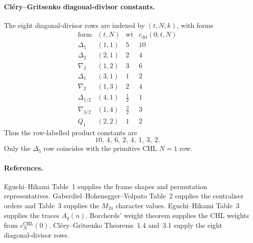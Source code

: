 \paragraph{Cl\'ery--Gritsenko diagonal-divisor constants.}
The eight diagonal-divisor rows are indexed by \((t,N;k)\), with
forms
\[
\begin{array}{c|c|c|c}
\text{form} & (t,N) & \operatorname{wt} & c_{\mathrm{dd}}(0;t,N)\\
\hline
\Delta_5 & (1,1) & 5 & 10\\
\Delta_2 & (2,1) & 2 & 4\\
\nabla_3 & (1,2) & 3 & 6\\
\Delta_1 & (3,1) & 1 & 2\\
\nabla_2 & (1,3) & 2 & 4\\
\Delta_{1/2} & (4,1) & \frac12 & 1\\
\nabla_{3/2} & (1,4) & \frac32 & 3\\
Q_1 & (2,2) & 1 & 2
\end{array}
\]
Thus the row-labelled product constants are
\[
  10,\ 4,\ 6,\ 2,\ 4,\ 1,\ 3,\ 2 .
\]
Only the \(\Delta_5\) row coincides with the primitive CHL \(N=1\) row.

\paragraph{References.}
Eguchi--Hikami Table~1 supplies the frame shapes and permutation
representatives. Gaberdiel--Hohenegger--Volpato Table~2 supplies the
centraliser orders and Table~3 supplies the \(M_{24}\) character values.
Eguchi--Hikami Table~3 supplies the traces \(A_g(n)\). Borcherds'
weight theorem supplies the CHL weights from \(c_N^{\mathrm{CHL}}(0)\).
Cl\'ery--Gritsenko Theorems~1.4 and~3.1 supply the eight
diagonal-divisor rows.
